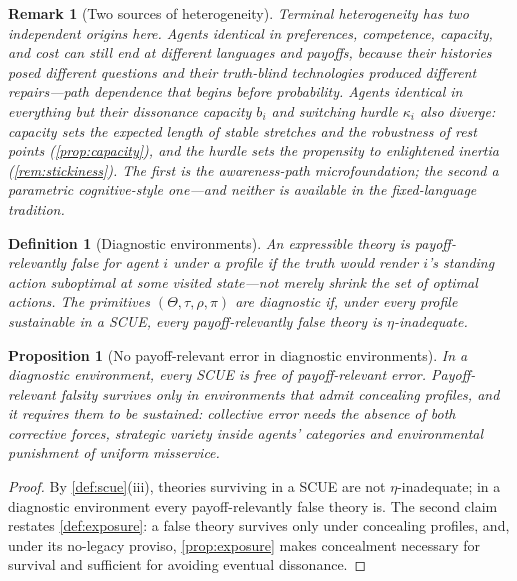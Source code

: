 \documentclass[11pt]{article}
\newtheorem{definition}[assumption]{Definition}
\newtheorem{proposition}[assumption]{Proposition}
\newtheorem{remark}[assumption]{Remark}
\theoremstyle{definition}
\begin{document}
\begin{remark}[Two sources of heterogeneity]
\label{rem:two-sources}
Terminal heterogeneity has two independent origins here.
Agents identical in preferences, competence, capacity, and cost can still end at different languages and payoffs, because their histories posed different questions and their truth-blind technologies produced different repairs---path dependence that begins before probability.
Agents identical in \emph{everything} but their dissonance capacity $b_i$ and switching hurdle $\kappa_i$ also diverge: capacity sets the expected length of stable stretches and the robustness of rest points (\cref{prop:capacity}), and the hurdle sets the propensity to enlightened inertia (\cref{rem:stickiness}).
The first is the awareness-path microfoundation; the second a parametric cognitive-style one---and neither is available in the fixed-language tradition.
\end{remark}

\begin{definition}[Diagnostic environments]
\label{def:diagnostic}
An expressible theory is \emph{payoff-relevantly false} for agent $i$ under a profile if the truth would render $i$'s standing action suboptimal at some visited state---not merely shrink the set of optimal actions.
The primitives $(\Theta,\tau,\rho,\pi)$ are \emph{diagnostic} if, under every profile sustainable in a SCUE, every payoff-relevantly false theory is $\eta$-inadequate.
\end{definition}

\begin{proposition}[No payoff-relevant error in diagnostic environments]
\label{prop:diagnostic}
In a diagnostic environment, every SCUE is free of payoff-relevant error.
Payoff-relevant falsity survives only in environments that admit concealing profiles, and it requires them to be sustained: collective error needs the absence of \emph{both} corrective forces, strategic variety inside agents' categories and environmental punishment of uniform misservice.
\end{proposition}

\begin{proof}
By \cref{def:scue}(iii), theories surviving in a SCUE are not $\eta$-inadequate; in a diagnostic environment every payoff-relevantly false theory is.
The second claim restates \cref{def:exposure}: a false theory survives only under concealing profiles, and, under its no-legacy proviso, \cref{prop:exposure} makes concealment necessary for survival and sufficient for avoiding eventual dissonance.
\end{proof}
\end{document}
